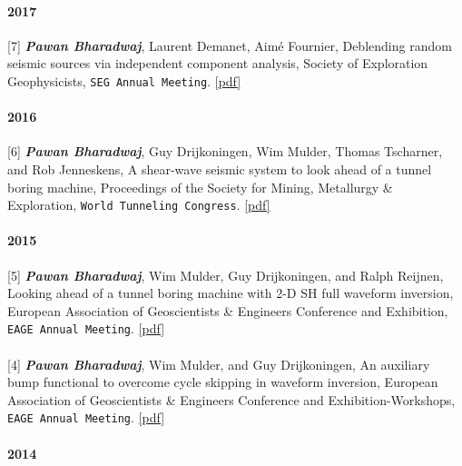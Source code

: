 \documentclass[9pt]{developercv} %
\begin{document}
\paragraph{2017}\label{section-30}

{[}7{]}
\textbf{\emph{Pawan
Bharadwaj}},
Laurent
Demanet,
Aimé
Fournier,
Deblending
random
seismic
sources
via
independent
component
analysis,
Society of
Exploration
Geophysicists,
\texttt{SEG\ Annual\ Meeting}.
\href{https://github.com/pawbz/pawbz.github.io/blob/src/pdf/abstracts/Pawan_ICA_SEG.pdf}{{[}pdf{]}}

\paragraph{2016}\label{section-31}

{[}6{]}
\textbf{\emph{Pawan
Bharadwaj}},
Guy
Drijkoningen,
Wim
Mulder,
Thomas
Tscharner,
and Rob
Jenneskens,
A
shear-wave
seismic
system to
look ahead
of a
tunnel
boring
machine,
Proceedings
of the
Society
for
Mining,
Metallurgy
\&
Exploration,
\texttt{World\ Tunneling\ Congress}.
\href{https://github.com/pawbz/pawbz.github.io/blob/src/pdf/abstracts/WTC2016_Pawan.pdf}{{[}pdf{]}}

\paragraph{2015}\label{section-32}

{[}5{]}
\textbf{\emph{Pawan
Bharadwaj}},
Wim
Mulder,
Guy
Drijkoningen,
and Ralph
Reijnen,
Looking
ahead of a
tunnel
boring
machine
with 2-D
SH full
waveform
inversion,
European
Association
of
Geoscientists
\&
Engineers
Conference
and
Exhibition,
\texttt{EAGE\ Annual\ Meeting}.
\href{https://github.com/pawbz/pawbz.github.io/blob/src/pdf/abstracts/Pawan_looking_aheadEAGE.pdf}{{[}pdf{]}}

\paragraph{}\label{section-33}

{[}4{]}
\textbf{\emph{Pawan
Bharadwaj}},
Wim
Mulder,
and Guy
Drijkoningen,
An
auxiliary
bump
functional
to
overcome
cycle
skipping
in
waveform
inversion,
European
Association
of
Geoscientists
\&
Engineers
Conference
and
Exhibition-Workshops,
\texttt{EAGE\ Annual\ Meeting}.
\href{https://github.com/pawbz/pawbz.github.io/blob/src/pdf/abstracts/bump_functional_workshop.pdf}{{[}pdf{]}}

\paragraph{2014}\label{section-34}
\end{document}
